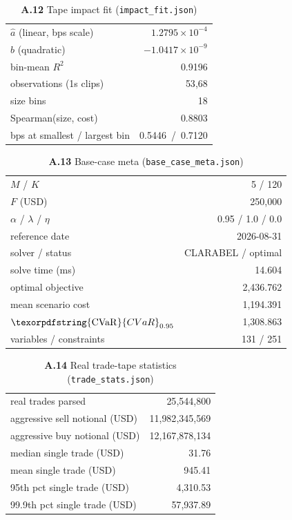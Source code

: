 \documentclass[11pt,a4paper]{article}
\theoremstyle{remark}
\newcommand{\cvar}{\texorpdfstring{\ensuremath{\mathrm{CVaR}}}{CVaR}}
\newcommand{\code}[1]{\texttt{#1}}
\begin{document}
\begin{landscape}
\begin{table}[H]
\centering
\caption*{\textbf{A.12} Tape impact fit (\code{impact\_fit.json})}
\small
\begin{tabular}{@{}lr@{}}
\toprule
$\hat a$ (linear, bps scale) & $1.2795\times 10^{-4}$ \\
$\hat b$ (quadratic) & $-1.0417\times 10^{-9}$ \\
bin-mean $R^{2}$ & 0.9196 \\
observations (1s clips) & 53{,}68 \\
size bins & 18 \\
Spearman(size, cost) & 0.8803 \\
bps at smallest / largest bin & 0.5446 \,/\, 0.7120 \\
\bottomrule
\end{tabular}
\end{table}

\begin{table}[H]
\centering
\caption*{\textbf{A.13} Base-case meta (\code{base\_case\_meta.json})}
\small
\begin{tabular}{@{}lr@{}}
\toprule
$M$ / $K$ & 5 / 120 \\
$F$ (USD) & 250{,}000 \\
$\alpha$ / $\lambda$ / $\eta$ & 0.95 / 1.0 / 0.0 \\
reference date & 2026-08-31 \\
solver / status & CLARABEL / optimal \\
solve time (ms) & 14.604 \\
optimal objective & 2{,}436.762 \\
mean scenario cost & 1{,}194.391 \\
$\cvar_{0.95}$ & 1{,}308.863 \\
variables / constraints & 131 / 251 \\
\bottomrule
\end{tabular}
\end{table}

\begin{table}[H]
\centering
\caption*{\textbf{A.14} Real trade-tape statistics (\code{trade\_stats.json})}
\small
\begin{tabular}{@{}lr@{}}
\toprule
real trades parsed & 25{,}544{,}800 \\
aggressive sell notional (USD) & 11{,}982{,}345{,}569 \\
aggressive buy notional (USD) & 12{,}167{,}878{,}134 \\
median single trade (USD) & 31.76 \\
mean single trade (USD) & 945.41 \\
95th pct single trade (USD) & 4{,}310.53 \\
99.9th pct single trade (USD) & 57{,}937.89 \\
\bottomrule
\end{tabular}
\end{table}
\end{landscape}
\end{document}

